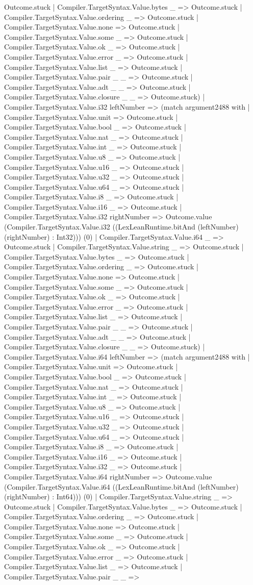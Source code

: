 \documentclass[11pt]{article}
\begin{document}
Outcome.stuck | Compiler.TargetSyntax.Value.bytes \_ => Outcome.stuck | Compiler.TargetSyntax.Value.ordering \_ => Outcome.stuck | Compiler.TargetSyntax.Value.none => Outcome.stuck | Compiler.TargetSyntax.Value.some \_ => Outcome.stuck | Compiler.TargetSyntax.Value.ok \_ => Outcome.stuck | Compiler.TargetSyntax.Value.error \_ => Outcome.stuck | Compiler.TargetSyntax.Value.list \_ => Outcome.stuck | Compiler.TargetSyntax.Value.pair \_ \_ => Outcome.stuck | Compiler.TargetSyntax.Value.adt \_ \_ => Outcome.stuck | Compiler.TargetSyntax.Value.closure \_ \_ => Outcome.stuck) | Compiler.TargetSyntax.Value.i32 leftNumber => (match argument2488 with | Compiler.TargetSyntax.Value.unit => Outcome.stuck | Compiler.TargetSyntax.Value.bool \_ => Outcome.stuck | Compiler.TargetSyntax.Value.nat \_ => Outcome.stuck | Compiler.TargetSyntax.Value.int \_ => Outcome.stuck | Compiler.TargetSyntax.Value.u8 \_ => Outcome.stuck | Compiler.TargetSyntax.Value.u16 \_ => Outcome.stuck | Compiler.TargetSyntax.Value.u32 \_ => Outcome.stuck | Compiler.TargetSyntax.Value.u64 \_ => Outcome.stuck | Compiler.TargetSyntax.Value.i8 \_ => Outcome.stuck | Compiler.TargetSyntax.Value.i16 \_ => Outcome.stuck | Compiler.TargetSyntax.Value.i32 rightNumber => Outcome.value (Compiler.TargetSyntax.Value.i32 ((LexLeanRuntime.bitAnd (leftNumber) (rightNumber) : Int32))) (0) | Compiler.TargetSyntax.Value.i64 \_ => Outcome.stuck | Compiler.TargetSyntax.Value.string \_ => Outcome.stuck | Compiler.TargetSyntax.Value.bytes \_ => Outcome.stuck | Compiler.TargetSyntax.Value.ordering \_ => Outcome.stuck | Compiler.TargetSyntax.Value.none => Outcome.stuck | Compiler.TargetSyntax.Value.some \_ => Outcome.stuck | Compiler.TargetSyntax.Value.ok \_ => Outcome.stuck | Compiler.TargetSyntax.Value.error \_ => Outcome.stuck | Compiler.TargetSyntax.Value.list \_ => Outcome.stuck | Compiler.TargetSyntax.Value.pair \_ \_ => Outcome.stuck | Compiler.TargetSyntax.Value.adt \_ \_ => Outcome.stuck | Compiler.TargetSyntax.Value.closure \_ \_ => Outcome.stuck) | Compiler.TargetSyntax.Value.i64 leftNumber => (match argument2488 with | Compiler.TargetSyntax.Value.unit => Outcome.stuck | Compiler.TargetSyntax.Value.bool \_ => Outcome.stuck | Compiler.TargetSyntax.Value.nat \_ => Outcome.stuck | Compiler.TargetSyntax.Value.int \_ => Outcome.stuck | Compiler.TargetSyntax.Value.u8 \_ => Outcome.stuck | Compiler.TargetSyntax.Value.u16 \_ => Outcome.stuck | Compiler.TargetSyntax.Value.u32 \_ => Outcome.stuck | Compiler.TargetSyntax.Value.u64 \_ => Outcome.stuck | Compiler.TargetSyntax.Value.i8 \_ => Outcome.stuck | Compiler.TargetSyntax.Value.i16 \_ => Outcome.stuck | Compiler.TargetSyntax.Value.i32 \_ => Outcome.stuck | Compiler.TargetSyntax.Value.i64 rightNumber => Outcome.value (Compiler.TargetSyntax.Value.i64 ((LexLeanRuntime.bitAnd (leftNumber) (rightNumber) : Int64))) (0) | Compiler.TargetSyntax.Value.string \_ => Outcome.stuck | Compiler.TargetSyntax.Value.bytes \_ => Outcome.stuck | Compiler.TargetSyntax.Value.ordering \_ => Outcome.stuck | Compiler.TargetSyntax.Value.none => Outcome.stuck | Compiler.TargetSyntax.Value.some \_ => Outcome.stuck | Compiler.TargetSyntax.Value.ok \_ => Outcome.stuck | Compiler.TargetSyntax.Value.error \_ => Outcome.stuck | Compiler.TargetSyntax.Value.list \_ => Outcome.stuck | Compiler.TargetSyntax.Value.pair \_ \_ => 
\end{document}
